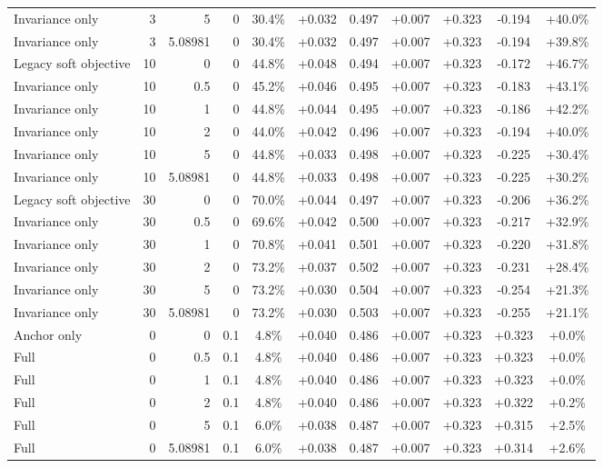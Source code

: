 \begin{table}[htbp]
\begin{tabular}{lrrrccccccc}
Invariance only & 3 & 5 & 0 & 30.4\% & +0.032 & 0.497 & +0.007 & +0.323 & -0.194 & +40.0\% \\
Invariance only & 3 & 5.08981 & 0 & 30.4\% & +0.032 & 0.497 & +0.007 & +0.323 & -0.194 & +39.8\% \\
Legacy soft objective & 10 & 0 & 0 & 44.8\% & +0.048 & 0.494 & +0.007 & +0.323 & -0.172 & +46.7\% \\
Invariance only & 10 & 0.5 & 0 & 45.2\% & +0.046 & 0.495 & +0.007 & +0.323 & -0.183 & +43.1\% \\
Invariance only & 10 & 1 & 0 & 44.8\% & +0.044 & 0.495 & +0.007 & +0.323 & -0.186 & +42.2\% \\
Invariance only & 10 & 2 & 0 & 44.0\% & +0.042 & 0.496 & +0.007 & +0.323 & -0.194 & +40.0\% \\
Invariance only & 10 & 5 & 0 & 44.8\% & +0.033 & 0.498 & +0.007 & +0.323 & -0.225 & +30.4\% \\
Invariance only & 10 & 5.08981 & 0 & 44.8\% & +0.033 & 0.498 & +0.007 & +0.323 & -0.225 & +30.2\% \\
Legacy soft objective & 30 & 0 & 0 & 70.0\% & +0.044 & 0.497 & +0.007 & +0.323 & -0.206 & +36.2\% \\
Invariance only & 30 & 0.5 & 0 & 69.6\% & +0.042 & 0.500 & +0.007 & +0.323 & -0.217 & +32.9\% \\
Invariance only & 30 & 1 & 0 & 70.8\% & +0.041 & 0.501 & +0.007 & +0.323 & -0.220 & +31.8\% \\
Invariance only & 30 & 2 & 0 & 73.2\% & +0.037 & 0.502 & +0.007 & +0.323 & -0.231 & +28.4\% \\
Invariance only & 30 & 5 & 0 & 73.2\% & +0.030 & 0.504 & +0.007 & +0.323 & -0.254 & +21.3\% \\
Invariance only & 30 & 5.08981 & 0 & 73.2\% & +0.030 & 0.503 & +0.007 & +0.323 & -0.255 & +21.1\% \\
Anchor only & 0 & 0 & 0.1 & 4.8\% & +0.040 & 0.486 & +0.007 & +0.323 & +0.323 & +0.0\% \\
Full & 0 & 0.5 & 0.1 & 4.8\% & +0.040 & 0.486 & +0.007 & +0.323 & +0.323 & +0.0\% \\
Full & 0 & 1 & 0.1 & 4.8\% & +0.040 & 0.486 & +0.007 & +0.323 & +0.323 & +0.0\% \\
Full & 0 & 2 & 0.1 & 4.8\% & +0.040 & 0.486 & +0.007 & +0.323 & +0.322 & +0.2\% \\
Full & 0 & 5 & 0.1 & 6.0\% & +0.038 & 0.487 & +0.007 & +0.323 & +0.315 & +2.5\% \\
Full & 0 & 5.08981 & 0.1 & 6.0\% & +0.038 & 0.487 & +0.007 & +0.323 & +0.314 & +2.6\% \\

\end{tabular}
\end{table}
